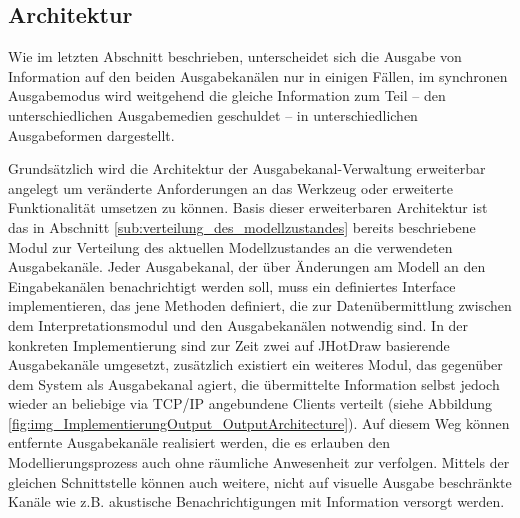 \subsection{Architektur} %
\label{sub:architekur}

Wie im letzten Abschnitt beschrieben, unterscheidet sich die Ausgabe von Information auf den beiden Ausgabekanälen nur in einigen Fällen, im synchronen Ausgabemodus wird weitgehend die gleiche Information zum Teil -- den unterschiedlichen Ausgabemedien geschuldet -- in unterschiedlichen Ausgabeformen dargestellt.  

Grundsätzlich wird die Architektur der Ausgabekanal-Verwaltung erweiterbar angelegt um veränderte Anforderungen an das Werkzeug oder erweiterte Funktionalität umsetzen zu können. Basis dieser erweiterbaren Architektur ist das in Abschnitt \ref{sub:verteilung_des_modellzustandes} bereits beschriebene Modul zur Verteilung des aktuellen Modellzustandes an die verwendeten Ausgabekanäle. Jeder Ausgabekanal, der über Änderungen am Modell an den Eingabekanälen benachrichtigt werden soll, muss ein definiertes Interface implementieren, das jene Methoden definiert, die zur Datenübermittlung zwischen dem Interpretationsmodul und den Ausgabekanälen notwendig sind. In der konkreten Implementierung sind zur Zeit zwei auf JHotDraw basierende Ausgabekanäle umgesetzt, zusätzlich existiert ein weiteres Modul, das gegenüber dem System als Ausgabekanal agiert, die übermittelte Information selbst jedoch wieder an beliebige via \gls{TCP}/\gls{IP} angebundene Clients verteilt (siehe Abbildung \ref{fig:img_ImplementierungOutput_OutputArchitecture}). Auf diesem Weg können entfernte Ausgabekanäle realisiert werden, die es erlauben den Modellierungsprozess auch ohne räumliche Anwesenheit zur verfolgen. Mittels der gleichen Schnittstelle können auch weitere, nicht auf visuelle Ausgabe beschränkte Kanäle wie z.B. akustische Benachrichtigungen mit Information versorgt werden. 

